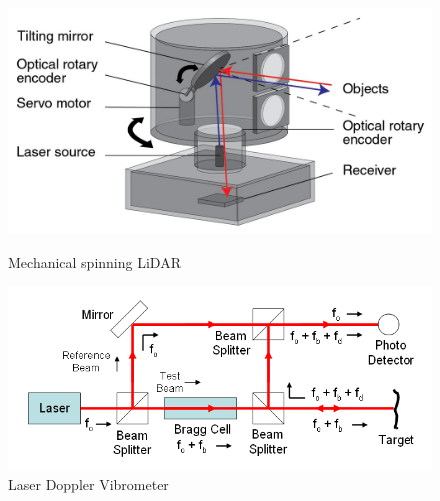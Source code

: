 \documentclass[sigconf, nonacm]{acmart}
\begin{document}
\begin{figure}[H]
  \centering
  \includegraphics[width=\linewidth]{embed/Lidar_scanner.jpg}
  \caption{Mechanical spinning LiDAR \cite{RenishawLidar}}
  \label{fig:LiDAR}

  \vspace{0.5cm}

  \includegraphics[width=\linewidth]{embed/Laser_Doppler_Vibrometer.png}
  \caption{Laser Doppler Vibrometer \cite{WikipediaLDV}}
  \label{fig:LDV}
\end{figure}
\end{document}
